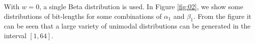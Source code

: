 \documentclass[10pt]{article}
\begin{document}
With $w=0$, a single Beta distribution is used. In Figure \ref{fig:02},
we show some distributions of bit-lengths for some combinations of $\alpha_1$ and $\beta_1$. From the figure it can be seen that a large variety of unimodal distributions can be generated in the interval $[1,64]$.
 

\begin{figure}[ht]
  \centering
  \subfigure[$\alpha=1,\beta=32$]{
}
\end{figure}
\end{document}
